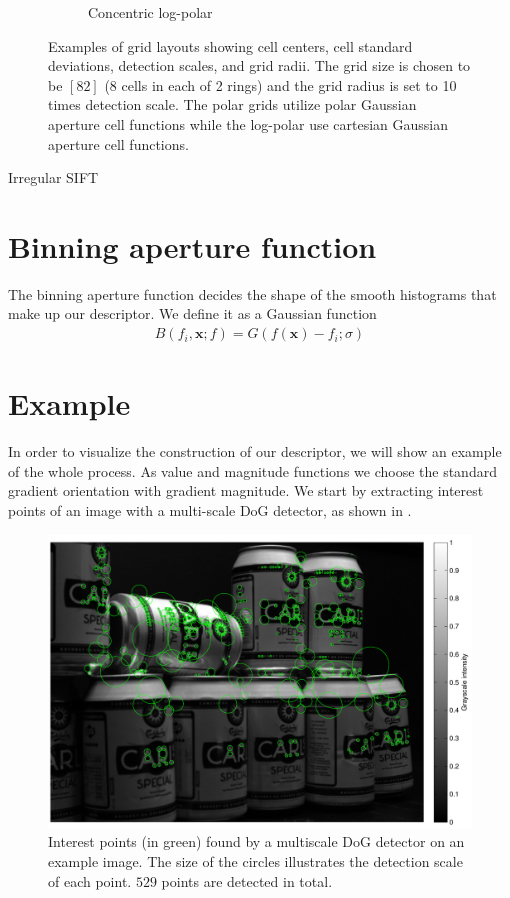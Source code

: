 \documentclass[thesis.tex]{subfiles}
\def\x{\mathbf{x}}
\begin{document}
\begin{figure}
\begin{subfigure}[t]{0.32\textwidth}
		\caption{Concentric log-polar}
		\label{fig:gridType_clp}
	\end{subfigure}
	\caption{Examples of grid layouts showing cell centers, cell standard deviations, detection scales, and grid radii. The grid size is chosen to be $[8 2]$ (8 cells in each of 2 rings) and the grid radius is set to 10 times detection scale. The polar grids utilize polar Gaussian aperture cell functions while the log-polar use cartesian Gaussian aperture cell functions.}
	\label{fig:gridType}
\end{figure}

Irregular SIFT \cite{cui2009scale}
%
\section{Binning aperture function}
%
The binning aperture function decides the shape of the smooth histograms that make up our descriptor. We define it as a Gaussian function
%
\begin{align}
B(f_i, \x; f) = G(f(\x) - f_i; \sigma)
\end{align}
%
\section{Example}
%
In order to visualize the construction of our descriptor, we will show an example of the whole process. As value and magnitude functions we choose the standard gradient orientation with gradient magnitude. We start by extracting interest points of an image with a multi-scale DoG detector, as shown in .

\begin{figure}[tb]
    \centering
    \includegraphics[width=\textwidth]{img/cellHistDetector.pdf}
    \caption{Interest points (in green) found by a multiscale DoG detector on an example image. The size of the circles illustrates the detection scale of each point. $529$ points are detected in total.}
    \label{fig:cellHistDetector}
\end{figure}
\end{document}

